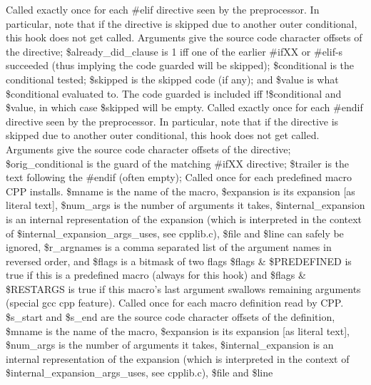 Called exactly once for each \#elif directive seen by the preprocessor. In particular,
note that if the directive is skipped due to another outer conditional, this
hook does not get called.
Arguments give the source code character
offsets of the directive; \$already\_\-did\_\-clause is 1 iff one of the
earlier \#ifXX or \#elif-s succeeded (thus implying the code guarded will be skipped);
\$conditional is the conditional tested; \$skipped is the skipped code (if any);
and \$value is what \$conditional evaluated to.  The code guarded is
included iff !\$conditional and \$value, in which case \$skipped will be empty.
Called exactly once for each \#endif directive seen by the preprocessor. In particular,
note that if the directive is skipped due to another outer conditional, this
hook does not get called.
Arguments give the source code character
offsets of the directive; \$orig\_\-conditional is the guard of the matching
\#ifXX directive; \$trailer is the text following the \#endif (often empty);
Called once for each predefined macro CPP installs.
\$mname is the name of the macro, \$expansion is its expansion [as literal text], 
\$num\_\-args is the number of arguments it takes, \$internal\_\-expansion is an
internal representation of the expansion (which is interpreted in the 
context of \$internal\_\-expansion\_\-args\_\-uses, see cpplib.c), \$file and \$line
can safely be ignored, \$r\_\-argnames is a comma separated list of the
argument names in reversed order, and \$flags is a bitmask of two flags
\$flags \& \$PREDEFINED is true if this is a predefined macro (always for this hook)
and \$flags \& \$RESTARGS is true if this macro's last argument swallows 
remaining arguments (special gcc cpp feature).
Called once for each macro definition read by  CPP.
\$s\_\-start and \$s\_\-end are the source code character offsets of the definition,
\$mname is the name of the macro, \$expansion is its expansion [as literal text], 
\$num\_\-args is the number of arguments it takes, \$internal\_\-expansion is an
internal representation of the expansion (which is interpreted in the 
context of \$internal\_\-expansion\_\-args\_\-uses, see cpplib.c), \$file and \$line
